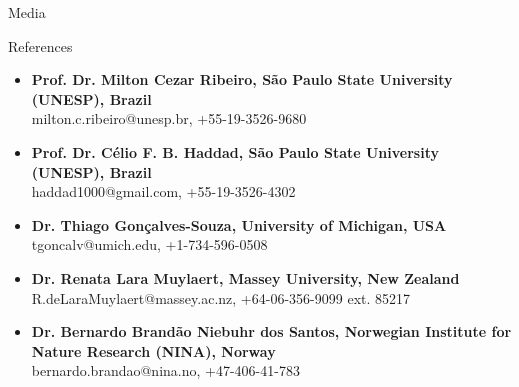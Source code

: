 \documentclass{resume}
\begin{document}
\begin{rSection}{Media}
\end{rSection}


\begin{rSection}{References}
\begin{itemize}
\item {\bf Prof. Dr. Milton Cezar Ribeiro, São Paulo State University (UNESP), Brazil} 
\\ milton.c.ribeiro@unesp.br, +55-19-3526-9680
\item {\bf Prof. Dr. Célio F. B. Haddad, São Paulo State University (UNESP), Brazil} 
\\ haddad1000@gmail.com, +55-19-3526-4302
\item {\bf Dr. Thiago Gonçalves-Souza, University of Michigan, USA} 
\\ tgoncalv@umich.edu, +1-734-596-0508
\item {\bf Dr. Renata Lara Muylaert, Massey University, New Zealand} 
\\ R.deLaraMuylaert@massey.ac.nz, +64-06-356-9099 ext. 85217
\item {\bf Dr. Bernardo Brandão Niebuhr dos Santos, Norwegian Institute for Nature Research (NINA), Norway} 
\\ bernardo.brandao@nina.no, +47-406-41-783
\end{itemize}
\end{rSection}
\end{document}
